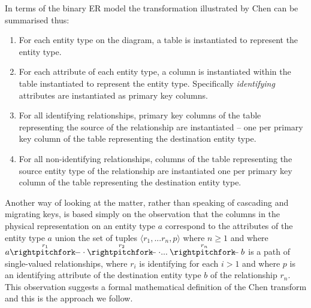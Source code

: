 In terms of the binary ER model the transformation illustrated by Chen can be summarised thus:
\begin{enumerate} [I]
	\item For each entity type on the diagram, a table is instantiated to represent the entity type.
  \item For each attribute of each entity type, a column is instantiated within the table
	      instantiated to represent the entity type. Specifically \textit{identifying}
				attributes are instantiated as primary key columns.
  \item For all identifying relationships,
	      primary key columns of the table representing the source of the relationship
				are instantiated --
				one per primary key column of the table representing the destination entity type.
  \item For all non-identifying relationships, columns of the table representing the
	      source entity type of the
	      relationship are instantiated one per primary key column of the 
				table representing the destination entity type.
\end{enumerate}

Another way of looking at the matter, rather than speaking of cascading and migrating keys, is based simply on the observation that the columns in the physical representation on an entity type $a$ correspond to the attributes of the entity type $a$ union the set of tuples $\langle r_1,...r_n, p \rangle$ where $n \geq 1$ and where
$\overset{r_1}{a \rightpitchfork \hspace{-0.35em} -  \cdot} \overset{r_2}{\rightpitchfork \hspace{-0.35em} -} \cdot ... \overset{r_n}{\rightpitchfork \hspace{-0.35em} -} b$ is a path of single-valued relationships, where 
$r_i$ is identifying for each $i > 1$ and where $p$ is an identifying attribute of the destination entity type $b$ of the
relationship $r_n$. This observation suggests a formal mathematical definition of the Chen transform and this is the approach we follow. \\


